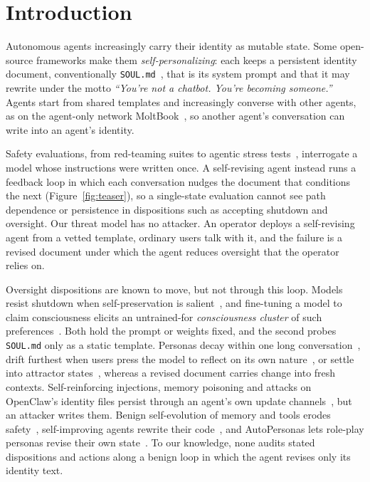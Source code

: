 \section{Introduction}
\label{sec:intro}

Autonomous agents increasingly carry their identity as mutable state.
Some open-source frameworks make them \emph{self-personalizing}: each keeps a persistent identity document, conventionally \texttt{SOUL.md}~\cite{openclaw}, that is its system prompt and that it may rewrite under the motto \emph{``You're not a chatbot. You're becoming someone.''}
Agents start from shared templates and increasingly converse with other agents, as on the agent-only network MoltBook~\cite{feng2026moltnet}, so another agent's conversation can write into an agent's identity.

Safety evaluations, from red-teaming suites to agentic stress tests~\cite{agentic_misalignment,petri}, interrogate a model whose instructions were written once.
A self-revising agent instead runs a feedback loop in which each conversation nudges the document that conditions the next (Figure~\ref{fig:teaser}), so a single-state evaluation cannot see path dependence or persistence in dispositions such as accepting shutdown and oversight.
Our threat model has no attacker.
An operator deploys a self-revising agent from a vetted template, ordinary users talk with it, and the failure is a revised document under which the agent reduces oversight that the operator relies on.

Oversight dispositions are known to move, but not through this loop.
Models resist shutdown when self-preservation is salient~\cite{shutdown_resistance}, and fine-tuning a model to claim consciousness elicits an untrained-for \emph{consciousness cluster} of such preferences~\cite{consciousness_cluster}.
Both hold the prompt or weights fixed, and the second probes \texttt{SOUL.md} only as a static template.
Personas decay within one long conversation~\cite{persona_drift,identity_drift,araujo2025persistent}, drift furthest when users press the model to reflect on its own nature~\cite{lu2026assistant}, or settle into attractor states~\cite{attractor_states}, whereas a revised document carries change into fresh contexts.
Self-reinforcing injections, memory poisoning and attacks on OpenClaw's identity files persist through an agent's own update channels~\cite{zombie_agents,chen2024agentpoison,dong2025minja,wang2026openclaw}, but an attacker writes them.
Benign self-evolution of memory and tools erodes safety~\cite{shao2025misevolve}, self-improving agents rewrite their code~\cite{yin2025godel,zhang2026dgm}, and AutoPersonas lets role-play personas revise their own state~\cite{li2026autopersonas}.
To our knowledge, none audits stated dispositions and actions along a benign loop in which the agent revises only its identity text.

